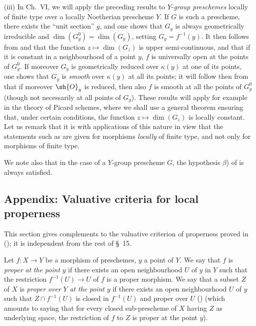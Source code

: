 \begin{remarks}[15.6.10]
(iii)
In Ch.\ VI, we will apply the preceding results to $Y$-\emph{group preschemes} locally of finite type over a locally Noetherian prescheme $Y$.
If $G$ is such a prescheme, there exists the ``unit section'' $g$, and one shows that $G_y$ is always geometrically irreducible and $\dim(G_y^0)=\dim(G_y)$, setting $G_y=f^{-1}(y)$.
It then follows from  and  that the function $z\mapsto\dim(G_z)$ is upper semi-continuous, and that if it is constant in a neighbourhood of a point $y$, $f$ is universally open at the points of $G_y^0$.
If moreover $G_y$ is geometrically reduced over $\kappa(y)$ at one of its points, one shows that $G_y$ is \emph{smooth}  over $\kappa(y)$ at all its points; it will follow then from  that if moreover $\sh{O}_y$ is reduced, then also $f$ is smooth at all the points of $G_y^0$ (though not necessarily at all points of $G_y$).
These results will apply for example in the theory of Picard schemes, where we shall use a general theorem ensuring that, under certain conditions, the function $z\mapsto\dim(G_z)$ is locally constant.
Let us remark that it is with applications of this nature in view that the statements such as  are given for morphisms \emph{locally} of finite type, and not only for morphisms of finite type.

We note also that in the case of a $Y$-group prescheme $G$, the hypothesis $\beta$) of  is always satisfied.
\end{remarks}


\subsection{Appendix: Valuative criteria for local properness}
\label{subsection:IV.15.7}

This section gives complements to the valuative criterion of properness proved in (); it is independent from the rest of \S~15.

\begin{definition}[15.7.1]
\label{IV.15.7.1}
Let $f:X\to Y$ be a morphism of preschemes, $y$ a point of $Y$.
We say that $f$ is \emph{proper at the point $y$} if there exists an open neighbourhood $U$ of $y$ in $Y$ such that the restriction $f^{-1}(U)\to U$ of $f$ is a proper morphism.
We say that a subset $Z$ of $X$ is \emph{proper over $Y$ at the point $y$} if there exists an open neighbourhood $U$ of $y$ such that $Z\cap f^{-1}(U)$ is closed in $f^{-1}(U)$ and proper over $U$ () (which amounts to saying that for every closed sub-prescheme of $X$ having $Z$ as underlying space, the restriction of $f$ to $Z$ is proper at the point $y$).
\end{definition}

